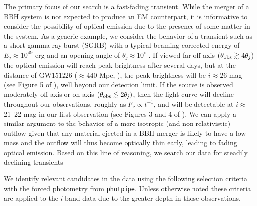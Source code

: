 The primary focus of our search is a fast-fading transient. 
While the merger of a BBH system is not expected
to produce an EM counterpart, it is informative to consider the
possibility of optical emission due to the presence of some matter in
the system. As a generic example, we consider the behavior of a
transient such as a short gamma-ray burst (SGRB) with a typical beaming-corrected energy of
$E_j \approx 10^{49}$ erg and an opening angle of $\theta_j\approx
10^\circ$ \citep{Berger2014,Fong+15}. If viewed far off-axis $(\theta_{\rm
obs}\gtrsim 4\theta_j)$ the optical emission will reach peak
brightness after several days, but at the distance of GW151226
($\approx440$ Mpc, \citealt{LIGOGW151226}), the peak brightness will be $i\approx 26$ mag (see Figure 5 of
\citealt{MetzgerBerger12}), well beyond our detection limit. If the source
is observed moderately off-axis or on-axis $(\theta_{\rm obs} \lesssim
2\theta_j)$, then the light curve will decline throughout our
observations, roughly as $F_\nu\propto t^{-1}$, and will be detectable
at $i\approx$ 21--22 mag in our first observation (see Figures 3 and 4
of \citealt{MetzgerBerger12}). We can apply a similar argument to the
behavior of a more isotropic (and non-relativistic) outflow given that
any material ejected in a BBH merger is likely to have a low mass and
the outflow will thus become optically thin early, leading to fading
optical emission. Based on this line of reasoning, we search our data
for steadily declining transients.

We identify relevant candidates in the data using the following
selection criteria with the forced photometry from {\tt photpipe}. 
Unless otherwise noted these criteria are applied to the $i$-band 
data due to the greater depth in those observations.

